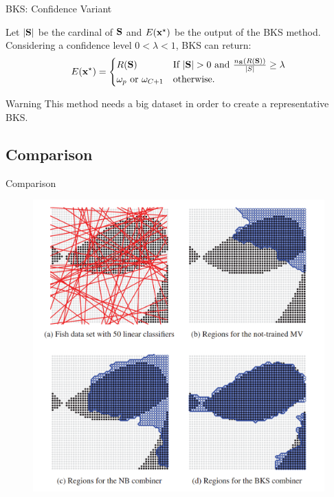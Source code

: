 \documentclass[xcolor=table]{beamer}
\DeclarePairedDelimiter\abs{\lvert}{\rvert}%
\begin{document}
\begin{frame}{BKS: Confidence Variant}

Let \(\abs{\bS}\) be the cardinal of \({\mathbf S}\) and \(E({\mathbf x}^\star)\) be the output of the BKS method. Considering a confidence level \(0 < \lambda < 1\), BKS can return:
\[
E(\bx^\star) = \begin{cases}
   R(\bS) & \text{If } \abs{\bS} > 0  \text{ and } \frac{n_\bS(R(\bS))}{\abs{S}} \geq \lambda\\
   \omega_p \text{ or } \omega_{C+1} & \text{otherwise}.
\end{cases}
\]

\pause
\begin{alertblock}{Warning}
This method needs a big dataset in order to create a representative BKS.
\end{alertblock}

\end{frame}



\subsection{Comparison}


\begin{frame}{Comparison}
\begin{figure}
    \centering
    \includegraphics[scale=0.18]{Images/Comparison.png}
\end{figure}
    
\end{frame}
\end{document}
